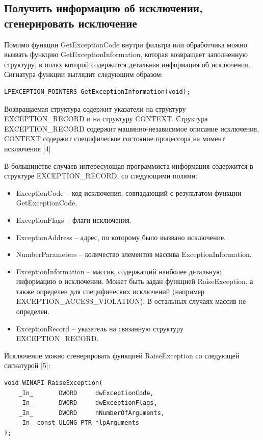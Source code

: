 \documentclass[14pt,a4paper,report]{report}
\begin{document}
\subsection{Получить информацию об исключении, сгенерировать исключение}

Помимо функции GetExceptionCode внутри фильтра или обработчика можно вызвать функцию GetExceptionInformation, которая возвращает заполненную структуру, в полях которой содержится детальная информация об исключении. Сигнатура функции выглядит следующим образом:

\begin{lstlisting}
LPEXCEPTION_POINTERS GetExceptionInformation(void);
\end{lstlisting}

Возвращаемая структура содержит указатели на структуру EXCEPTION\_RECORD и на структуру CONTEXT. Структура EXCEPTION\_RECORD содержит машинно-независимое описание исключения, CONTEXT содержит специфическое состояние процессора на момент исключения [4]

В большинстве случаев интересующая программиста информация содержится в структуре EXCEPTION\_RECORD, со следующими полями:

\begin{itemize}
	\item ExceptionCode -- код исключения, совпадающий с результатом функции GetExceptionCode.
	\item ExceptionFlags -- флаги исключения.
	\item ExceptionAddress -- адрес, по которому было вызвано исключение.
	\item NumberParameters -- количество элементов массива ExceptionInformation.
	\item ExceptionInformation -- массив, содержащий наиболее детальную информацию о исключении. Может быть задан функцией RaiseException, а также определен для специфических исключений (например EXCEPTION\_ACCESS\_VIOLATION). В остальных случаях массив не определен.
	\item ExceptionRecord -- указатель на связанную структуру EXCEPTION\_RECORD.
\end{itemize}

Исключение можно сгенерировать функцией RaiseException со следующей сигнатурой [5]:

\begin{lstlisting}
void WINAPI RaiseException(
    _In_       DWORD     dwExceptionCode,
    _In_       DWORD     dwExceptionFlags,
    _In_       DWORD     nNumberOfArguments,
    _In_ const ULONG_PTR *lpArguments
);
\end{lstlisting}
\end{document}
